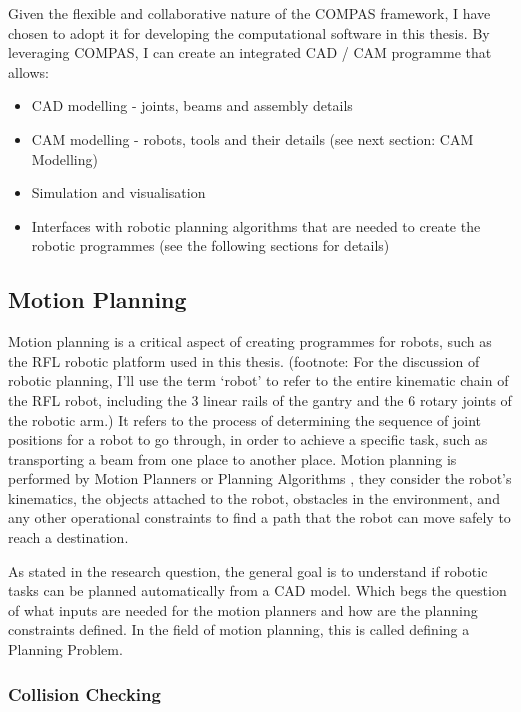 Given the flexible and collaborative nature of the COMPAS framework, I have chosen to adopt it for developing the computational software in this thesis. By leveraging COMPAS, I can create an integrated CAD / CAM programme that allows:
\begin{itemize}
    \item CAD modelling - joints, beams and assembly details
    \item CAM modelling - robots, tools and their details (see next section: CAM Modelling)
    \item Simulation and visualisation
    \item Interfaces with robotic planning algorithms that are needed to create the robotic programmes (see the following sections for details)
\end{itemize}

\subsection{Motion Planning}

Motion planning is a critical aspect of creating programmes for robots, such as the RFL robotic platform used in this thesis. (footnote: For the discussion of robotic planning, I’ll use the term ‘robot’ to refer to the entire kinematic chain of the RFL robot, including the 3 linear rails of the gantry and the 6 rotary joints of the robotic arm.) It refers to the process of determining the sequence of joint positions for a robot to go through, in order to achieve a specific task, such as transporting a beam from one place to another place. Motion planning is performed by Motion Planners or Planning Algorithms \parencite{lavallePlanningAlgorithms2006}, they consider the robot's kinematics, the objects attached to the robot, obstacles in the environment, and any other operational constraints to find a path that the robot can move safely to reach a destination.

As stated in the research question, the general goal is to understand if robotic tasks can be planned automatically from a CAD model. Which begs the question of what inputs are needed for the motion planners and how are the planning constraints defined. In the field of motion planning, this is called defining a Planning Problem.

\subsubsection{Collision Checking}

